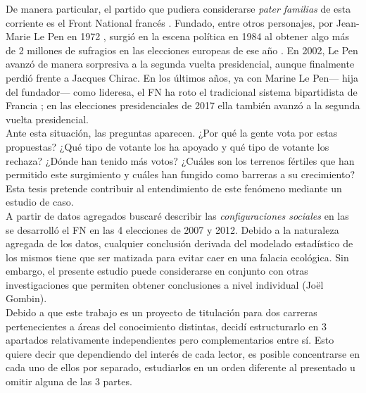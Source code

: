 De manera particular, el partido que pudiera considerarse \textit{pater familias} de esta corriente es el Front National francés \parencite{Mudde07a}. Fundado, entre otros personajes, por Jean-Marie Le Pen en 1972 \parencite{Stockemer17}, surgió en la escena política en 1984 al obtener algo más de 2 millones de sufragios en las elecciones europeas de ese año \parencite{LeBras15}. En 2002, Le Pen avanzó de manera sorpresiva a la segunda vuelta presidencial, aunque finalmente perdió frente a Jacques Chirac. En los últimos años, ya con Marine Le Pen--- hija del fundador--- como lideresa, el FN ha roto el tradicional sistema bipartidista de Francia \parencite{LeBras16};  en las elecciones presidenciales de 2017 ella también avanzó a la segunda vuelta presidencial.\\

Ante esta situación, las preguntas aparecen. ¿Por qué la gente vota por estas propuestas? ¿Qué tipo de votante los ha apoyado y qué tipo de votante los rechaza? ¿Dónde han tenido más votos? ¿Cuáles son los terrenos fértiles que han permitido este surgimiento y cuáles han fungido como barreras a su crecimiento? Esta tesis pretende contribuir al entendimiento de este fenómeno mediante un estudio de caso.\\ 

A partir de datos agregados buscaré describir las \textit{configuraciones sociales} en las se desarrolló el FN en las 4 elecciones de 2007 y 2012. Debido a la naturaleza agregada de los datos, cualquier conclusión derivada del modelado estadístico de los mismos tiene que ser matizada para evitar caer en una falacia ecológica. Sin embargo, el presente estudio puede considerarse en conjunto con otras investigaciones que permiten obtener conclusiones a nivel individual {\color{Red} (Joël Gombin)}.\\ 

Debido a que este trabajo es un proyecto de titulación para dos carreras pertenecientes a áreas del conocimiento distintas, decidí estructurarlo en 3 apartados relativamente independientes pero complementarios entre sí. Esto quiere decir que dependiendo del interés de cada lector, es posible concentrarse en cada uno de ellos por separado, estudiarlos en un orden diferente al presentado u omitir alguna de las 3 partes.\\ 

